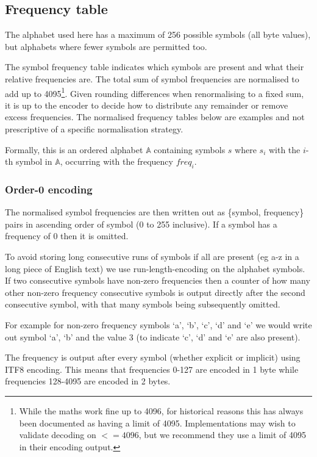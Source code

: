 \documentclass[a4paper]{article}
\begin{document}
\subsection{\textbf{Frequency table}}

The alphabet used here has a maximum of 256 possible symbols (all byte
values), but alphabets where fewer symbols are permitted too.

The symbol frequency table indicates which symbols are present and
what their relative frequencies are.  The total sum of symbol
frequencies are normalised to add up to 4095\footnote{While the maths
  work fine up to 4096, for historical reasons this has always been
  documented as having a limit of 4095.  Implementations may wish to
  validate decoding on $<= 4096$, but we recommend they use a limit of
  4095 in their encoding output.}.  Given rounding differences when
renormalising to a fixed sum, it is up to the encoder to decide how to
distribute any remainder or remove excess frequencies.  The normalised
frequency tables below are examples and not prescriptive of a specific
normalisation strategy.

Formally, this is an ordered alphabet $\mathbb{A}$ containing symbols $s$ where
$s_{i}$ with the $i$-th symbol in $\mathbb{A}$, occurring with the frequency $freq_{i}$.

\subsubsection*{Order-0 encoding}

The normalised symbol frequencies are then written out as \{symbol,
frequency\} pairs in ascending order of symbol (0 to 255 inclusive).
If a symbol has a frequency of 0 then it is omitted.

To avoid storing long consecutive runs of symbols if all are present
(eg a-z in a long piece of English text) we use run-length-encoding on
the alphabet symbols.  If two consecutive symbols have non-zero
frequencies then a counter of how many other non-zero frequency
consecutive symbols is output directly after the second consecutive
symbol, with that many symbols being subsequently omitted.

For example for non-zero frequency symbols `a', `b', `c', `d' and `e'
we would write out symbol `a', `b' and the value 3 (to indicate `c',
`d' and `e' are also present).

The frequency is output after every symbol (whether explicit or
implicit) using ITF8 encoding. This means that frequencies 0-127 are
encoded in 1 byte while frequencies 128-4095 are encoded in 2 bytes.
\end{document}
